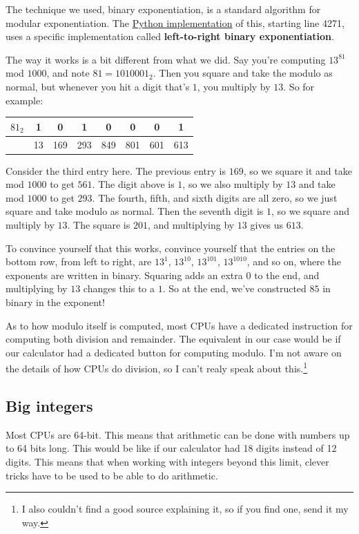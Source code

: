 \documentclass[11pt,paper=letter]{scrartcl}
\begin{document}
The technique we used, binary exponentiation, is a standard algorithm for modular exponentiation. The \href{https://github.com/python/cpython/blob/0378d98678f3617fd44d9a6266e7c17ebce62755/Objects/longobject.c}{Python implementation} of this, starting line 4271, uses a specific implementation called \textbf{left-to-right binary exponentiation}.

The way it works is a bit different from what we did. Say you're computing $13^{81}$ mod $1000$, and note $81 = 1010001_2$. Then you square and take the modulo as normal, but whenever you hit a digit that's $1$, you multiply by $13$. So for example:
\begin{center}
  \begin{tabular}{c|ccccccc}
  $81_2$ & 1 & 0 & 1 & 0 & 0 & 0 & 1 \\ \hline
         & 13 & 169 & 293 & 849 & 801 & 601 & 613
  \end{tabular}
\end{center}
Consider the third entry here. The previous entry is $169$, so we square it and take mod $1000$ to get $561$. The digit above is $1$, so we also multiply by $13$ and take mod $1000$ to get $293$. The fourth, fifth, and sixth digits are all zero, so we just square and take modulo as normal. Then the seventh digit is $1$, so we square and multiply by $13$. The square is $201$, and multiplying by $13$ gives us $613$.

To convince yourself that this works, convince yourself that the entries on the bottom row, from left to right, are $13^1$, $13^{10}$, $13^{101}$, $13^{1010}$, and so on, where the exponents are written in binary. Squaring adds an extra $0$ to the end, and multiplying by $13$ changes this to a $1$. So at the end, we've constructed $85$ in binary in the exponent!

As to how modulo itself is computed, most CPUs have a dedicated instruction for computing both division and remainder. The equivalent in our case would be if our calculator had a dedicated button for computing modulo. I'm not aware on the details of how CPUs do division, so I can't realy speak about this.\footnote{I also couldn't find a good source explaining it, so if you find one, send it my way.}

\subsection{Big integers}

Most CPUs are 64-bit. This means that arithmetic can be done with numbers up to 64 bits long. This would be like if our calculator had 18 digits instead of 12 digits. This means that when working with integers beyond this limit, clever tricks have to be used to be able to do arithmetic.
\end{document}
